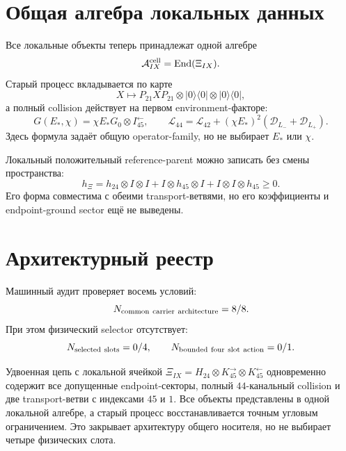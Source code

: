 \section{Общая алгебра локальных данных}

Все локальные объекты теперь принадлежат одной алгебре
\begin{equation}
 \mathcal A_{IX}^{\rm cell}=\operatorname{End}(\Xi_{IX}).
 \label{eq:v9-common-carrier-algebra}
\end{equation}
Старый процесс вкладывается по карте
\begin{equation}
 X\longmapsto P_{21}XP_{21}\otimes|0\rangle\langle0|
 \otimes|0\rangle\langle0|,
 \label{eq:v9-common-carrier-old-embedding}
\end{equation}
а полный collision действует на первом environment-факторе:
\begin{equation}
 G(E_*,\chi)=\chi E_*G_0\otimes I_{45}^{\leftarrow},
 \qquad
 \mathcal L_{44}=\mathcal L_{42}
 +(\chi E_*)^2(\mathcal D_{L_-}+\mathcal D_{L_+}).
 \label{eq:v9-common-carrier-collision-family}
\end{equation}
Здесь формула задаёт общую operator-family, но не выбирает $E_*$ или
$\chi$.

Локальный положительный reference-parent можно записать без смены
пространства:
\begin{equation}
 h_{\Xi}=h_{24}\otimes I\otimes I
 +I\otimes h_{45}\otimes I
 +I\otimes I\otimes h_{45}\geq0.
 \label{eq:v9-common-carrier-reference-parent}
\end{equation}
Его форма совместима с обеими transport-ветвями, но его коэффициенты и
endpoint-ground sector ещё не выведены.

\section{Архитектурный реестр}

Машинный аудит проверяет восемь условий:
\begin{equation}
 N_{\rm common\ carrier\ architecture}=8/8.
 \label{eq:v9-common-carrier-architecture-ledger}
\end{equation}
При этом физический selector отсутствует:
\begin{equation}
 N_{\rm selected\ slots}=0/4,
 \qquad N_{\rm bounded\ four\ slot\ action}=0/1.
 \label{eq:v9-common-carrier-open-ledger}
\end{equation}

\begin{theorem}
Удвоенная цепь с локальной ячейкой
$\Xi_{IX}=H_{24}\otimes K_{45}^{\rightarrow}\otimes K_{45}^{\leftarrow}$
одновременно содержит все допущенные endpoint-секторы, полный
$44$-канальный collision и две transport-ветви с индексами $45$ и $1$.
Все объекты представлены в одной локальной алгебре, а старый процесс
восстанавливается точным угловым ограничением. Это закрывает архитектуру
общего носителя, но не выбирает четыре физических слота.
\end{theorem}


